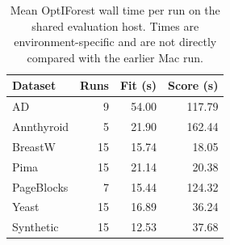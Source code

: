 \begin{table}[t]\centering\small
\begin{tabular}{lrrr}\toprule
Dataset & Runs & Fit (s) & Score (s) \\ \midrule
AD & 9 & 54.00 & 117.79 \\
Annthyroid & 5 & 21.90 & 162.44 \\
BreastW & 15 & 15.74 & 18.05 \\
Pima & 15 & 21.14 & 20.38 \\
PageBlocks & 7 & 15.44 & 124.32 \\
Yeast & 15 & 16.89 & 36.24 \\
Synthetic & 15 & 12.53 & 37.68 \\
\bottomrule\end{tabular}
\caption{Mean OptIForest wall time per run on the shared evaluation host. Times are environment-specific and are not directly compared with the earlier Mac run.}\label{tab:runtime}
\end{table}
